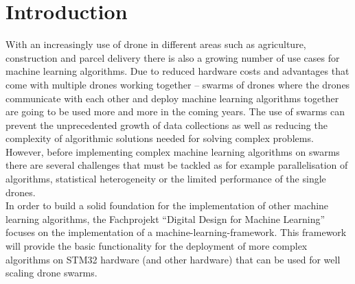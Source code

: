  
 



\maketitle %

\tableofcontents %
\newpage

\section{Introduction} \label{sec:Intro}

With an increasingly use of drone in different areas such as agriculture, construction and parcel delivery there is also a growing number of use cases for machine learning algorithms. Due to reduced hardware costs and advantages that come with multiple drones working together – swarms of drones where the drones communicate with each other and deploy machine learning algorithms together are going to be used more and more in the coming years. The use of swarms can prevent the unprecedented growth of data collections as well as reducing the complexity of algorithmic solutions needed for solving complex problems. \\
However, before implementing complex machine learning algorithms on swarms there are several challenges that must be tackled as for example parallelisation of algorithms, statistical heterogeneity or the limited performance of the single drones. \\
In order to build a solid foundation for the implementation of other machine learning algorithms, the Fachprojekt “Digital Design for Machine Learning” focuses on the implementation of a machine-learning-framework. This framework will provide the basic functionality for the deployment of more complex algorithms on STM32 hardware (and other hardware) that can be used for well scaling drone swarms.
 

